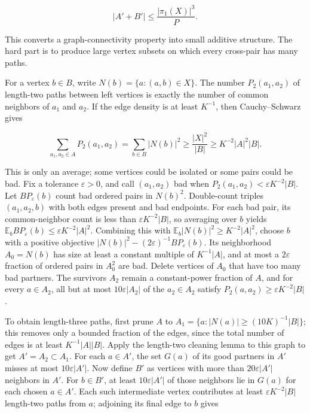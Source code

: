\[|A'+B'|\le \frac{|\pi_1(X)|^3}{P}.\]

This converts a graph-connectivity property into small additive structure. The hard part is to produce large vertex subsets on which every cross-pair has many paths.

For a vertex \(b\in B\), write \(N(b)=\{a:(a,b)\in X\}\). The number \(P_2(a_1,a_2)\) of length-two paths between left vertices is exactly the number of common neighbors of \(a_1\) and \(a_2\). If the edge density is at least \(K^{-1}\), then Cauchy--Schwarz gives

\[\sum_{a_1,a_2\in A}P_2(a_1,a_2)=\sum_{b\in B}|N(b)|^2\ge \frac{|X|^2}{|B|}\ge K^{-2}|A|^2|B|.\]

This is only an average; some vertices could be isolated or some pairs could be bad. Fix a tolerance \(\varepsilon>0\), and call \((a_1,a_2)\) bad when \(P_2(a_1,a_2)<\varepsilon K^{-2}|B|\). Let \(BP_\varepsilon(b)\) count bad ordered pairs in \(N(b)^2\). Double-count triples \((a_1,a_2,b)\) with both edges present and bad endpoints. For each bad pair, its common-neighbor count is less than \(\varepsilon K^{-2}|B|\), so averaging over \(b\) yields \(\mathbb E_b BP_\varepsilon(b)\le\varepsilon K^{-2}|A|^2\). Combining this with \(\mathbb E_b|N(b)|^2\ge K^{-2}|A|^2\), choose \(b\) with a positive objective \(|N(b)|^2-(2\varepsilon)^{-1}BP_\varepsilon(b)\). Its neighborhood \(A_0=N(b)\) has size at least a constant multiple of \(K^{-1}|A|\), and at most a \(2\varepsilon\) fraction of ordered pairs in \(A_0^2\) are bad. Delete vertices of \(A_0\) that have too many bad partners. The survivors \(A_2\) remain a constant-power fraction of \(A\), and for every \(a\in A_2\), all but at most \(10\varepsilon|A_2|\) of the \(a_2\in A_2\) satisfy \(P_2(a,a_2)\ge\varepsilon K^{-2}|B|\).

To obtain length-three paths, first prune \(A\) to \(A_1=\{a:|N(a)|\ge (10K)^{-1}|B|\}\); this removes only a bounded fraction of the edges, since the total number of edges is at least \(K^{-1}|A||B|\). Apply the length-two cleaning lemma to this graph to get \(A'=A_2\subset A_1\). For each \(a\in A'\), the set \(G(a)\) of its good partners in \(A'\) misses at most \(10\varepsilon|A'|\). Now define \(B'\) as vertices with more than \(20\varepsilon|A'|\) neighbors in \(A'\). For \(b\in B'\), at least \(10\varepsilon|A'|\) of those neighbors lie in \(G(a)\) for each chosen \(a\in A'\). Each such intermediate vertex contributes at least \(\varepsilon K^{-2}|B|\) length-two paths from \(a\); adjoining its final edge to \(b\) gives

